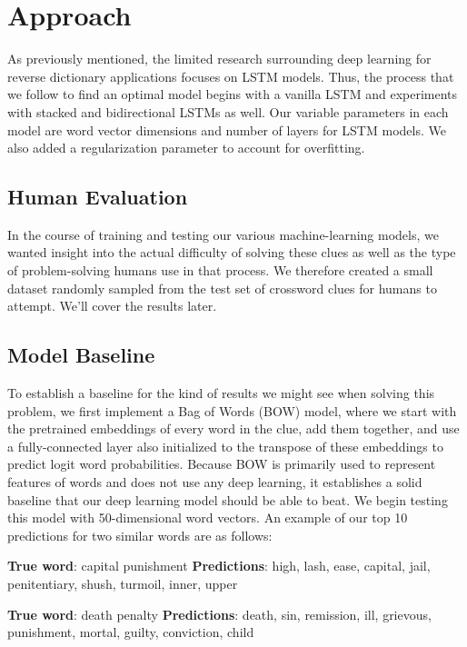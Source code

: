 \documentclass{article} %
\begin{document}
\section{Approach}
As previously mentioned, the limited research surrounding deep learning for reverse dictionary applications focuses on LSTM models. Thus, the process that we follow to find an optimal model begins with a vanilla LSTM and experiments with stacked and bidirectional LSTMs as well. Our variable parameters in each model are word vector dimensions and number of layers for LSTM models. We also added a regularization parameter to account for overfitting.

\subsection{Human Evaluation}
In the course of training and testing our various machine-learning models, we wanted insight into the actual difficulty of solving these clues as well as the type of problem-solving humans use in that process. We therefore created a small dataset randomly sampled from the test set of crossword clues for humans to attempt. We’ll cover the results later.

\subsection{Model Baseline}
To establish a baseline for the kind of results we might see when solving this problem, we first implement a Bag of Words (BOW) model, where we start with the pretrained embeddings of every word in the clue, add them together, and use a fully-connected layer also initialized to the transpose of these embeddings to predict logit word probabilities. Because BOW is primarily used to represent features of words and does not use any deep learning, it establishes a solid baseline that our deep learning model should be able to beat. We begin testing this model with 50-dimensional word vectors. An example of our top 10 predictions for two similar words are as follows:

\textbf{True word}: capital punishment
\textbf{Predictions}: high, lash, ease, capital, jail, penitentiary, shush, turmoil, inner, upper

\textbf{True word}: death penalty
\textbf{Predictions}: death, sin, remission, ill, grievous, punishment, mortal, guilty, conviction, child
\end{document}
